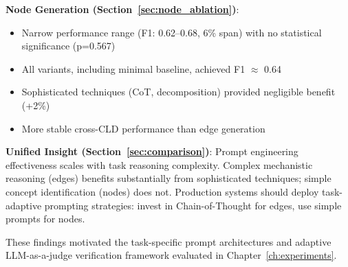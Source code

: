 \textbf{Node Generation (Section~\ref{sec:node_ablation})}:
\begin{itemize}
    \item Narrow performance range (F1: 0.62--0.68, 6\% span) with no statistical significance (p=0.567)
    \item All variants, including minimal baseline, achieved F1 $\approx$ 0.64
    \item Sophisticated techniques (CoT, decomposition) provided negligible benefit (+2\%)
    \item More stable cross-CLD performance than edge generation
\end{itemize}

\textbf{Unified Insight (Section~\ref{sec:comparison})}: Prompt engineering effectiveness scales with task reasoning complexity. Complex mechanistic reasoning (edges) benefits substantially from sophisticated techniques; simple concept identification (nodes) does not. Production systems should deploy task-adaptive prompting strategies: invest in Chain-of-Thought for edges, use simple prompts for nodes.

These findings motivated the task-specific prompt architectures and adaptive LLM-as-a-judge verification framework evaluated in Chapter~\ref{ch:experiments}.
